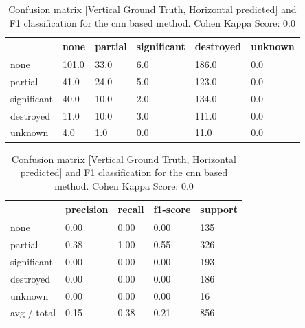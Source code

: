\begin{table} [H]
	\footnotesize
	\captionsetup{justification=raggedright,singlelinecheck=false}
	\caption{Confusion matrix [Vertical Ground Truth, Horizontal predicted] and F1 classification for the \ac{cnn} based method. Cohen Kappa Score: 0.0 }	
	\begin{tabular}{l|lllll}
            & none  & partial & significant & destroyed & unknown \\\hline
none        & 101.0 & 33.0    & 6.0         & 186.0     & 0.0     \\
partial     & 41.0  & 24.0    & 5.0         & 123.0     & 0.0     \\
significant & 40.0  & 10.0    & 2.0         & 134.0     & 0.0     \\
destroyed   & 11.0  & 10.0    & 3.0         & 111.0     & 0.0     \\
unknown     & 4.0   & 1.0     & 0.0         & 11.0      & 0.0   
	\end{tabular}
	\begin{tabular}{l|llll}
            & precision & recall & f1-score & support \\\hline
none        & 0.00      & 0.00   & 0.00     & 135     \\
partial     & 0.38      & 1.00   & 0.55     & 326     \\
significant & 0.00      & 0.00   & 0.00     & 193     \\
destroyed   & 0.00      & 0.00   & 0.00     & 186     \\
unknown     & 0.00      & 0.00   & 0.00     & 16      \\
avg / total & 0.15      & 0.38   & 0.21     & 856  
	\end{tabular}
	\label{tab:matCNN2}
\end{table}

